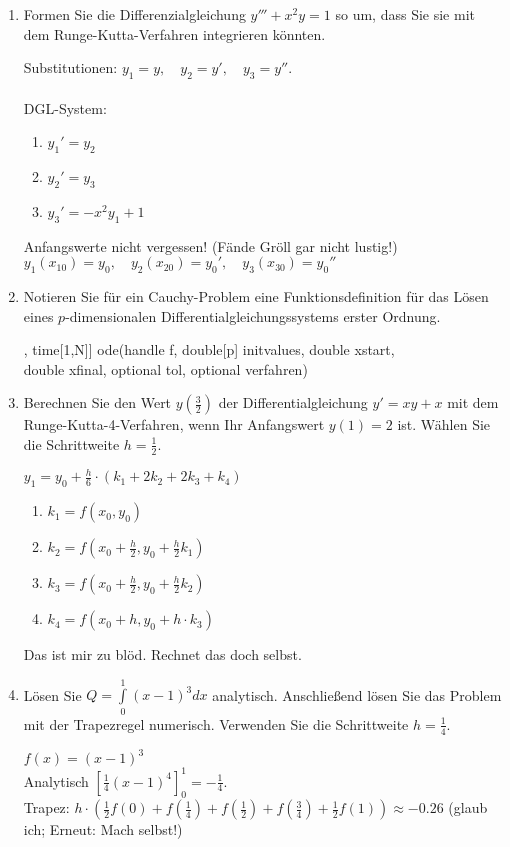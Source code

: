 \documentclass[12pt]{article}
\begin{document}
\begin{enumerate}
	\item Formen Sie die Differenzialgleichung $y''' + x^2y = 1$ so um, dass Sie sie mit dem Runge-Kutta-Verfahren integrieren könnten.
	\begin{solution}
	Substitutionen: $y_1 = y,\quad y_2 = y',\quad y_3 = y''$.\\\\
	DGL-System:
	\begin{enumerate}
		\item $y_1' = y_2$
		\item $y_2' = y_3$
		\item $y_3' = -x^2y_1 + 1$
	\end{enumerate}
	
	Anfangswerte nicht vergessen! (Fände Gröll gar nicht lustig!)\\
	$y_1(x_{10}) = y_0,\quad y_2(x_{20}) = y_0', \quad y_3(x_{30}) = y_0''$
	\end{solution}
	\item Notieren Sie für ein Cauchy-Problem eine Funktionsdefinition für das Lösen eines $p$-dimensionalen Differentialgleichungssystems erster Ordnung.

	\begin{solution}
		[double[p, N], time[1,N]] ode(handle f, double[p] initvalues, double xstart,\\
		\indentTab \indentTab double xfinal, optional tol, optional verfahren)
	\end{solution}	
	
	
	\item Berechnen Sie den Wert $y(\frac{3}{2})$ der Differentialgleichung $y' = xy + x$ mit dem Runge-Kutta-4-Verfahren, wenn Ihr Anfangswert $y(1) = 2$ ist. Wählen Sie die Schrittweite $h = \frac{1}{2}$.
	\begin{solution}
	$y_1 = y_0 + \frac{h}{6} \cdot ( k_1 + 2k_2 + 2k_3 + k_4 )$\\
	\begin{enumerate}[label=$\,$]
		\item $k_1 = f(x_0, y_0)$
		\item $k_2 = f(x_0 + \frac{h}{2}, y_0 + \frac{h}{2}k_1)$
		\item $k_3 = f(x_0 + \frac{h}{2}, y_0 + \frac{h}{2}k_2)$
		\item $k_4 = f(x_0 + h, y_0 + h\cdot k_3)$
	\end{enumerate}
	Das ist mir zu blöd. Rechnet das doch selbst.
	\end{solution}

	
	\item Lösen Sie $Q = \int\limits_0^1 (x-1)^3 dx$ analytisch. Anschließend lösen Sie das Problem mit der Trapezregel numerisch. Verwenden Sie die Schrittweite $h = \frac{1}{4}$.
	\begin{solution}
	$f(x) = (x-1)^3$\\
	Analytisch $[\frac{1}{4}(x-1)^4]_0^1 = -\frac{1}{4}$.\\
	Trapez: $h \cdot (\frac{1}{2} f(0) + f(\frac{1}{4}) +f(\frac{1}{2})+f(\frac{3}{4})+\frac{1}{2} f(1)) \approx -0.26$ (glaub ich; Erneut: Mach selbst!)
	\end{solution}
\end{enumerate}
\end{document}
